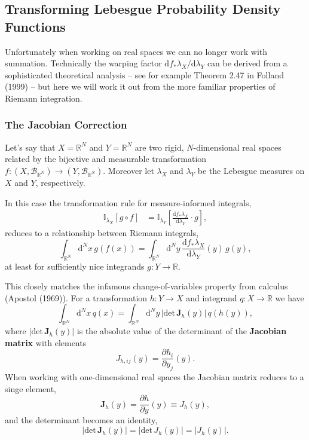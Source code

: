 \documentclass[
  letterpaper,
  DIV=11,
  numbers=noendperiod]{scrartcl}
\begin{document}
\hypertarget{transforming-lebesgue-probability-density-functions}{%
\subsection{Transforming Lebesgue Probability Density
Functions}\label{transforming-lebesgue-probability-density-functions}}

Unfortunately when working on real spaces we can no longer work with
summation. Technically the warping factor
\(\mathrm{d} f_{*} \lambda_{X} / \mathrm{d} \lambda_{Y}\) can be derived
from a sophisticated theoretical analysis -- see for example Theorem
2.47 in Folland (1999) -- but here we will work it out from the more
familiar properties of Riemann integration.

\hypertarget{the-jacobian-correction}{%
\subsubsection{The Jacobian Correction}\label{the-jacobian-correction}}

Let's say that \(X = \mathbb{R}^{N}\) and \(Y = \mathbb{R}^{N}\) are two
rigid, \(N\)-dimensional real spaces related by the bijective and
measurable transformation
\(f : (X, \mathcal{B}_{\mathbb{R}^{N}}) \rightarrow  (Y, \mathcal{B}_{\mathbb{R}^{N}})\).
Moreover let \(\lambda_{X}\) and \(\lambda_{Y}\) be the Lebesgue
measures on \(X\) and \(Y\), respectively.

In this case the transformation rule for measure-informed integrals,
\begin{align*}
\mathbb{I}_{\lambda_{X}} [ g \circ f ]
&=
\mathbb{I}_{\lambda_{Y}} \left[
\frac{ \mathrm{d} f_{*} \lambda_{X} }{ \mathrm{d} \lambda_{Y}} \cdot g
\right],
\end{align*} reduces to a relationship between Riemann integrals, \[
\int_{\mathbb{R}^{N}} \mathrm{d}^{N} x \, g(f(x))
=
\int_{\mathbb{R}^{N}} \mathrm{d}^{N} y \,
\frac{ \mathrm{d} f_{*} \lambda_{X} }{ \mathrm{d} \lambda_{Y}}(y) \,
g(y),
\] at least for sufficiently nice integrands
\(g : Y \rightarrow \mathbb{R}\).

This closely matches the infamous change-of-variables property from
calculus (Apostol (1969)). For a transformation \(h : Y \rightarrow X\)
and integrand \(q : X \rightarrow \mathbb{R}\) we have \[
\int_{\mathbb{R}^{N}} \mathrm{d}^{N} x \, q(x)
=
\int_{\mathbb{R}^{N}} \mathrm{d}^{N} y \,
| \mathrm{det} \,  \mathbf{J}_{h}(y) | \, q(h(y)),
\] where \(| \mathrm{det} \, \mathbf{J}_{h}(y) |\) is the absolute value
of the determinant of the \textbf{Jacobian matrix} with elements \[
J_{h, ij}(y) = \frac{ \partial h_{i} }{ \partial y_{j} } (y).
\] When working with one-dimensional real spaces the Jacobian matrix
reduces to a singe element, \[
\mathbf{J}_{h}(y) 
= \frac{ \partial h }{ \partial y } (y) 
\equiv J_{h}(y),
\] and the determinant becomes an identity, \[
| \mathrm{det} \, \mathbf{J}_{h}(y) |
=
| \mathrm{det} \, J_{h}(y) |
=
| J_{h}(y) |.
\]
\end{document}
